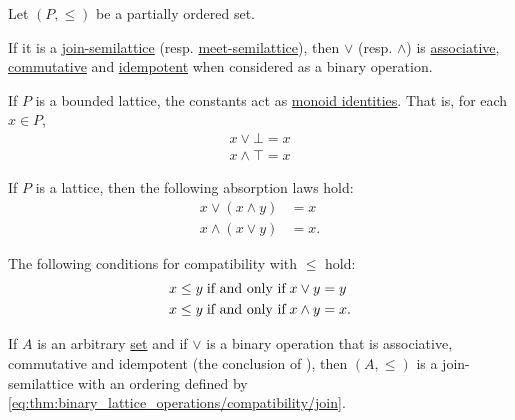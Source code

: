 \begin{proposition}\label{thm:binary_lattice_operations}
  Let \( (P, \leq) \) be a partially ordered set.

  \begin{thmenum}
     If it is a \hyperref[def:semilattice/join]{join-semilattice} (resp. \hyperref[def:semilattice/meet]{meet-semilattice}), then \( \vee \) (resp. \( \wedge \)) is \hyperref[def:magma/associative]{associative}, \hyperref[def:magma/commutative]{commutative} and \hyperref[def:magma/idempotent]{idempotent} when considered as a binary operation.

     If \( P \) is a bounded lattice, the constants act as \hyperref[def:monoid]{monoid identities}. That is, for each \( x \in P \),
    \begin{align}
      x \vee \bot = x \label{eq:thm:binary_lattice_operations/identity/join} \\
      x \wedge \top = x \label{eq:thm:binary_lattice_operations/identity/meet}
    \end{align}

     If \( P \) is a lattice, then the following absorption laws hold:
    \begin{align}
      x \vee (x \wedge y) &= x \label{eq:thm:binary_lattice_operations/absorption/join} \\
      x \wedge (x \vee y) &= x \label{eq:thm:binary_lattice_operations/absorption/meet}.
    \end{align}

     The following conditions for compatibility with \( \leq \) hold:
    \begin{align}
      x \leq y &\T{if and only if} x \vee y = y \label{eq:thm:binary_lattice_operations/compatibility/join} \\
      x \leq y &\T{if and only if} x \wedge y = x \label{eq:thm:binary_lattice_operations/compatibility/meet}.
    \end{align}

     If \( A \) is an arbitrary \hyperref[def:set]{set} and if \( \vee \) is a binary operation that is associative, commutative and idempotent (the conclusion of ), then \( (A, \leq) \) is a join-semilattice with an ordering defined by \eqref{eq:thm:binary_lattice_operations/compatibility/join}.


\end{thmenum}
\end{proposition}
